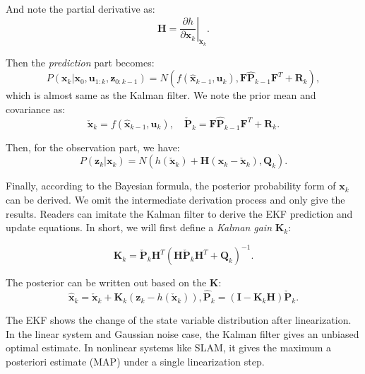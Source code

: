And note the partial derivative as:
\begin{equation}
	\mathbf{H} = \left. {\frac{{\partial h}}{{\partial {\mathbf{x}_k}}}} \right|_{{{\mathbf{\check x}}_k}}.
\end{equation}

Then the \textit{prediction} part becomes:
\begin{equation}
	P\left( {{\mathbf{x}_k}|{\mathbf{x}_0},{\mathbf{u}_{1:k}},{\mathbf{z}_{0:k - 1}}} \right)
	= N(f\left( {{{\mathbf{\hat x}}_{k - 1}},{\mathbf{u}_k}} \right), \mathbf{F}\mathbf{\hat{P}}_{k-1} \mathbf{F}^T + \mathbf{R}_k),
\end{equation}
which is almost same as the Kalman filter. We note the prior mean and covariance as:
\begin{equation}
	\mathbf{\check {x}}_k = f\left( {{{\mathbf{\hat x}}_{k - 1}},{\mathbf{u}_k}} \right), \quad \mathbf{\check{P}}_k = \mathbf{F}\mathbf{\hat{P}}_{k-1} \mathbf{F}^T + \mathbf{R}_k.
\end{equation}

Then, for the observation part, we have: 
\begin{equation}
	P\left( {{\mathbf{z}_k}|{\mathbf{x}_k}} \right) = N( h\left( {{{\mathbf{\check x}}_k}} \right) + \mathbf{H} \left( {\mathbf{x}_k - {{\mathbf{\check x}}_k}} \right), \mathbf{Q}_k ).
\end{equation}

Finally, according to the Bayesian formula, the posterior probability form of $\mathbf{x}_k$ can be derived. We omit the intermediate derivation process and only give the results. Readers can imitate the Kalman filter to derive the EKF prediction and update equations. In short, we will first define a \textit{Kalman gain} $\mathbf{K}_k$:

\begin{equation}
	\mathbf{K}_k = {\mathbf{\check{P}}_{k}}{\mathbf{H}^T}{\left( {\mathbf{H}{\mathbf{\check P}_k}{\mathbf{H}^T} + {\mathbf{Q}_k}} \right)^{ - 1}}.
\end{equation}

The posterior can be written out based on the $\mathbf{K}$: 
\begin{equation}
	{{\mathbf{\hat x}}_k} = {{\mathbf{\check x}}_k} + {\mathbf{K}_k}\left( {{\mathbf{z}_k} - h\left( {{\mathbf{\check x}_k}} \right)} \right),{\mathbf{\hat P}_k} = \left( {\mathbf{I} - {\mathbf{K}_k}{\mathbf{H}}} \right) \mathbf{\check{P}}_k.
\end{equation}

The EKF shows the change of the state variable distribution after linearization. In the linear system and Gaussian noise case, the Kalman filter gives an unbiased optimal estimate. In nonlinear systems like SLAM, it gives the maximum a posteriori estimate (MAP) under a single linearization step. 

